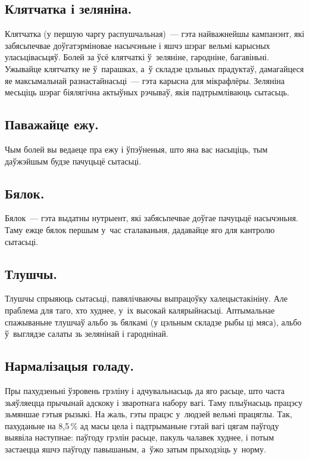 \subsection{Клятчатка і зеляніна.}
Клятчатка (у першую чаргу распушчальная)~--- гэта найважнейшы кампанэнт, які забясьпечвае доўгатэрміновае насычэньне і яшчэ шэраг вельмі карысных уласьцівасьцяў. Болей за ўсё клятчаткі ў~зеляніне, гародніне, багавіньні. Ужывайце клятчатку не ў~парашках, а~ў складзе цэльных прадуктаў, дамагайцеся яе максымальнай разнастайнасьці~--- гэта карысна для мікрафлёры. Зеляніна месьціць шэраг біялягічна актыўных рэчываў, якія падтрымліваюць сытасьць.


\subsection{Паважайце ежу.}
Чым болей вы ведаеце пра ежу і ўпэўненыя, што яна вас насыціць, тым даўжэйшым будзе пачуцьцё сытасьці.

\subsection{Бялок.}
Бялок~--- гэта выдатны нутрыент, які забясьпечвае доўгае пачуцьцё насычэньня. Таму ежце бялок першым у~час сталаваньня, дадавайце яго для кантролю сытасьці.

\subsection{Тлушчы.}
Тлушчы спрыяюць сытасьці, павялічваючы выпрацоўку халецыстакініну. Але праблема для таго, хто худнее, у~іх высокай калярыйнасьці. Аптымальнае спажываньне тлушчаў альбо зь бялкамі (у цэльным складзе рыбы ці мяса), альбо ў~выглядзе салаты зь зелянінай і гароднінай.

\subsection{Нармалізацыя голаду.}
Пры пахудзеньні ўзровень грэліну і адчувальнасьць да яго расьце, што часта зьяўляецца прычынай адскоку і зваротнага набору вагі. Таму плыўнасьць працэсу зьмяншае гэтыя рызыкі. На жаль, гэты працэс у~людзей вельмі працяглы. Так, пахуданьне на 8,5\,\% ад масы цела і падтрыманьне гэтай вагі  цягам паўгоду выявіла наступнае: паўгоду грэлін расьце, пакуль чалавек худнее, і потым застаецца яшчэ паўгоду павышаным, а~ўжо затым прыходзіць у~норму.

